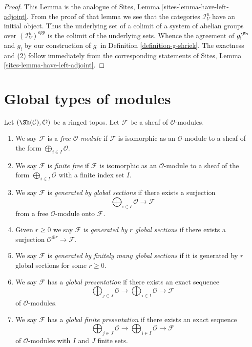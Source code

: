 \begin{proof}
This Lemma is the analogue of
Sites, Lemma \ref{sites-lemma-have-left-adjoint}.
From the proof of that lemma we see that the categories
$\mathcal{I}_V^u$ have an initial object. Thus the underlying set of a
colimit of a system of abelian groups over $(\mathcal{I}_V^u)^{opp}$
is the colimit of the underlying sets. Whence the agreement
of $g_!^{\Sh}$ and $g_!$ by our construction of $g_!$ in
Definition \ref{definition-g-shriek}.
The exactness and (2) follow immediately from the corresponding statements of
Sites, Lemma \ref{sites-lemma-have-left-adjoint}.
\end{proof}





\section{Global types of modules}
\label{section-global}

\begin{definition}
\label{definition-global}
Let $(\Sh(\mathcal{C}), \mathcal{O})$ be a ringed topos.
Let $\mathcal{F}$ be a sheaf of $\mathcal{O}$-modules.
\begin{enumerate}
\item We say $\mathcal{F}$ is a {\it free $\mathcal{O}$-module}
if $\mathcal{F}$ is isomorphic as an $\mathcal{O}$-module
to a sheaf of the form $\bigoplus_{i \in I} \mathcal{O}$.
\item We say $\mathcal{F}$ is {\it finite free} if
$\mathcal{F}$ is isomorphic as an $\mathcal{O}$-module
to a sheaf of the form $\bigoplus_{i \in I} \mathcal{O}$
with a finite index set $I$.
\item We say $\mathcal{F}$ is {\it generated by global sections}
if there exists a surjection
$$
\bigoplus\nolimits_{i \in I} \mathcal{O} \longrightarrow \mathcal{F}
$$
from a free $\mathcal{O}$-module onto $\mathcal{F}$.
\item Given $r \geq 0$ we say $\mathcal{F}$ is
{\it generated by $r$ global sections} if there exists a surjection
$\mathcal{O}^{\oplus r} \to \mathcal{F}$.
\item We say $\mathcal{F}$ is {\it generated by finitely many global sections}
if it is generated by $r$ global sections for some $r \geq 0$.
\item We say $\mathcal{F}$ has a {\it global presentation}
if there exists an exact sequence
$$
\bigoplus\nolimits_{j \in J} \mathcal{O} \longrightarrow
\bigoplus\nolimits_{i \in I} \mathcal{O} \longrightarrow
\mathcal{F}
$$
of $\mathcal{O}$-modules.
\item We say $\mathcal{F}$ has a {\it global finite presentation}
if there exists an exact sequence
$$
\bigoplus\nolimits_{j \in J} \mathcal{O} \longrightarrow
\bigoplus\nolimits_{i \in I} \mathcal{O} \longrightarrow
\mathcal{F}
$$
of $\mathcal{O}$-modules with $I$ and $J$ finite sets.
\end{enumerate}
\end{definition}

